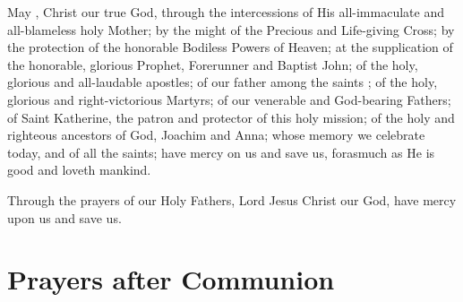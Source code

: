 \documentclass[twoside, letterpaper, 12pt]{report}
\begin{document}
\begin{priest}
\item May , Christ our true God, through the intercessions of His
    all-immaculate and all-blameless holy Mother; by the might of the Precious and Life-giving Cross;
    by the protection of the honorable Bodiless Powers of Heaven;
    at the supplication of the honorable, glorious Prophet, Forerunner and Baptist John;
    of the holy, glorious and all-laudable apostles;
    of our father among the saints
      ;
    of the holy, glorious and right-victorious Martyrs;
    of our venerable and God-bearing Fathers;
    of Saint Katherine, the patron and protector of this holy mission;
    of the holy and righteous ancestors of God, Joachim and Anna;
     whose memory we celebrate today,
    and of all the saints;
    have mercy on us and save us, forasmuch as He is good and loveth mankind.
\item Through the prayers of our Holy Fathers, Lord Jesus Christ our God,
    have mercy upon us and save us.
\end{priest}


\cleardoublepage
\chapter*{Prayers after Communion}
\begin{maybetwocolumns}

\end{maybetwocolumns}
\end{document}
